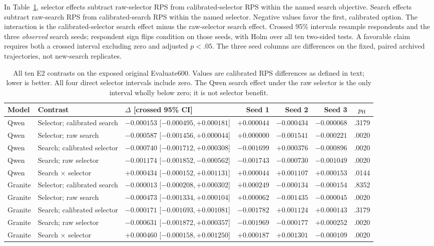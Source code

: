 \documentclass[10pt,twocolumn]{article}
\begin{document}
In Table~\ref{tab:e2-contrasts}, selector effects subtract raw-selector RPS
from calibrated-selector RPS within the named search objective. Search effects
subtract raw-search RPS from calibrated-search RPS within the named selector.
Negative values favor the first, calibrated option. The interaction is the
calibrated-selector search effect minus the raw-selector search effect.
Crossed 95\% intervals resample respondents and the three \emph{observed}
search seeds; respondent sign flips condition on those seeds, with Holm over
all ten two-sided tests. A favorable claim requires both a crossed interval
excluding zero and adjusted $p<.05$. The three seed columns are differences
on the fixed, paired archived trajectories, not new-search replicates.

\begin{table}[H]\centering\scriptsize\setlength{\tabcolsep}{3pt}
\caption{All ten E2 contrasts on the exposed original Evaluate600. Values are
calibrated RPS differences as defined in text; lower is better. All four
direct selector intervals include zero. The Qwen search effect under the raw
selector is the only interval wholly below zero; it is not selector benefit.}
\label{tab:e2-contrasts}
\begin{tabular}{@{}lp{}lrrrc@{}}\toprule
Model & Contrast & $\Delta$ [crossed 95\% CI] & Seed 1 & Seed 2 & Seed 3 & $p_{\rm H}$\\\midrule
Qwen & Selector; calibrated search & $-0.000153$ [$-0.000495,+0.000181$] & $+0.000044$ & $-0.000434$ & $-0.000068$ & .3179\\
Qwen & Selector; raw search & $-0.000587$ [$-0.001456,+0.000044$] & $+0.000000$ & $-0.001541$ & $-0.000221$ & .0020\\
Qwen & Search; calibrated selector & $-0.000740$ [$-0.001712,+0.000308$] & $-0.001699$ & $+0.000376$ & $-0.000896$ & .0020\\
Qwen & Search; raw selector & $-0.001174$ [$-0.001852,-0.000562$] & $-0.001743$ & $-0.000730$ & $-0.001049$ & .0020\\
Qwen & Search $\times$ selector & $+0.000434$ [$-0.000152,+0.001131$] & $+0.000044$ & $+0.001107$ & $+0.000153$ & .0144\\\midrule
Granite & Selector; calibrated search & $-0.000013$ [$-0.000208,+0.000302$] & $+0.000249$ & $-0.000134$ & $-0.000154$ & .8352\\
Granite & Selector; raw search & $-0.000473$ [$-0.001334,+0.000104$] & $+0.000062$ & $-0.001435$ & $-0.000045$ & .0020\\
Granite & Search; calibrated selector & $-0.000171$ [$-0.001693,+0.001081$] & $-0.001782$ & $+0.001124$ & $+0.000143$ & .3179\\
Granite & Search; raw selector & $-0.000631$ [$-0.001872,+0.000357$] & $-0.001969$ & $-0.000177$ & $+0.000252$ & .0020\\
Granite & Search $\times$ selector & $+0.000460$ [$-0.000158,+0.001250$] & $+0.000187$ & $+0.001301$ & $-0.000109$ & .0020\\\bottomrule
\end{tabular}\end{table}
\end{document}

